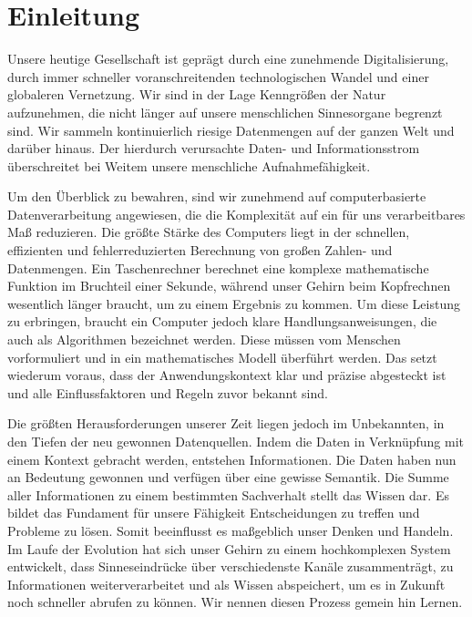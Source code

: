

\section{Einleitung}



Unsere heutige Gesellschaft ist geprägt durch eine zunehmende Digitalisierung, durch immer schneller voranschreitenden technologischen Wandel und einer globaleren Vernetzung. Wir sind in der Lage Kenngrößen der Natur aufzunehmen, die nicht länger auf unsere menschlichen Sinnesorgane begrenzt sind. Wir sammeln kontinuierlich riesige Datenmengen auf der ganzen Welt und darüber hinaus. Der hierdurch verursachte Daten- und Informationsstrom überschreitet bei Weitem unsere menschliche Aufnahmefähigkeit.

Um den Überblick zu bewahren, sind wir zunehmend auf computerbasierte Datenverarbeitung angewiesen, die die Komplexität auf ein für uns verarbeitbares Maß reduzieren. Die größte Stärke des Computers liegt in der schnellen, effizienten und fehlerreduzierten Berechnung von großen Zahlen- und Datenmengen. Ein Taschenrechner berechnet eine komplexe mathematische Funktion im Bruchteil einer Sekunde, während unser Gehirn beim Kopfrechnen wesentlich länger braucht, um zu einem Ergebnis zu kommen. Um diese Leistung zu erbringen, braucht ein Computer jedoch klare Handlungsanweisungen, die auch als Algorithmen bezeichnet werden. Diese müssen vom Menschen vorformuliert und in ein mathematisches Modell überführt werden. Das setzt wiederum voraus, dass der Anwendungskontext klar und präzise abgesteckt ist und alle Einflussfaktoren und Regeln zuvor bekannt sind.

Die größten Herausforderungen unserer Zeit liegen jedoch im Unbekannten, in den Tiefen der neu gewonnen Datenquellen. Indem die Daten in Verknüpfung mit einem Kontext gebracht werden, entstehen Informationen. Die Daten haben nun an Bedeutung gewonnen und verfügen über eine gewisse Semantik. Die Summe aller Informationen zu einem bestimmten Sachverhalt stellt das Wissen dar. Es bildet das Fundament für unsere Fähigkeit Entscheidungen zu treffen und Probleme zu lösen. Somit beeinflusst es maßgeblich unser Denken und Handeln. Im Laufe der Evolution hat sich unser Gehirn zu einem hochkomplexen System entwickelt, dass Sinneseindrücke über verschiedenste Kanäle zusammenträgt, zu Informationen weiterverarbeitet und als Wissen abspeichert, um es in Zukunft noch schneller abrufen zu können. Wir nennen diesen Prozess gemein hin Lernen.

